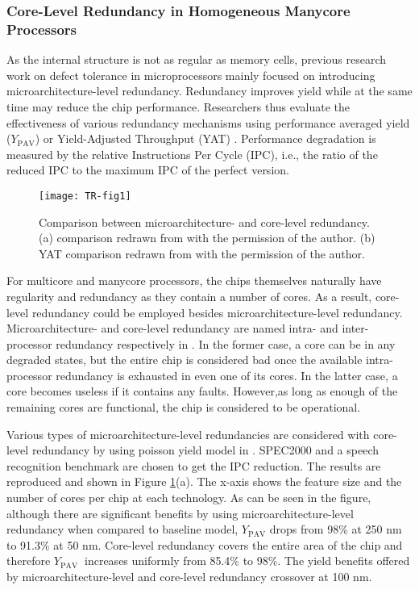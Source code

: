 \subsubsection{Core-Level Redundancy in Homogeneous Manycore Processors}
As the internal structure is not as regular as memory cells, previous research work on defect tolerance in microprocessors mainly focused on introducing microarchitecture-level redundancy. Redundancy improves yield while at the same time may reduce the chip performance. Researchers thus evaluate the effectiveness of various redundancy mechanisms using performance averaged yield ($Y_{\text{PAV}}$)\cite{shivakumar2003exploiting} or Yield-Adjusted Throughput (YAT) \cite{schuchman2005rescue}. Performance degradation is measured by the relative Instructions Per Cycle (IPC), i.e., the ratio of the reduced IPC to the maximum IPC of the perfect version.

\begin{figure}[t]
    \centering
        \texttt{[image: TR-fig1]}
          \caption{ Comparison between microarchitecture- and core-level redundancy.
          (a) comparison redrawn from \cite{shivakumar2003exploiting} with the permission of the author.
          (b) YAT comparison redrawn from \cite{schuchman2005rescue} with the permission of the author.}
             \label{fig1}
\end{figure}

For multicore and manycore processors, the chips themselves naturally have regularity and redundancy as they contain a number of cores. As a result, core-level redundancy could be employed besides microarchitecture-level redundancy. Microarchitecture- and core-level redundancy are named intra- and inter-processor redundancy respectively in \cite{shivakumar2003exploiting}. In the former case, a core can be in any degraded states, but the entire chip is considered bad once the available intra-processor redundancy is exhausted in even one of its cores. In the latter case, a core becomes useless if it contains any faults. However,as long as enough of the remaining cores are functional, the chip is considered to be operational.

Various types of microarchitecture-level redundancies are considered with core-level redundancy by using poisson yield model in \cite{shivakumar2003exploiting}. SPEC2000 and a speech recognition benchmark are chosen to get the IPC reduction. The results are reproduced and shown in Figure \ref{fig1}(a). The x-axis shows the feature size and the number of cores per chip at each technology. As can be seen in the figure, although there are significant benefits by using microarchitecture-level redundancy when compared to baseline model, $Y_{\text{PAV}}$ drops from 98\% at 250 nm to 91.3\% at 50 nm. Core-level redundancy covers the entire area of the chip and therefore $Y_{\text{PAV }}$ increases uniformly from 85.4\% to 98\%. The yield benefits offered by microarchitecture-level and core-level redundancy crossover at 100 nm.

